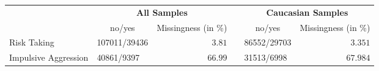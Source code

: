 \begin{tabular}{llrclr}
\hline\hline
\multicolumn{1}{l}{\bfseries }&\multicolumn{2}{c}{\bfseries All Samples}&\multicolumn{1}{c}{\bfseries }&\multicolumn{2}{c}{\bfseries Caucasian Samples}\tabularnewline
\cline{2-3} \cline{5-6}
\multicolumn{1}{l}{}&\multicolumn{1}{c}{no/yes}&\multicolumn{1}{c}{Missingness (in \%)}&\multicolumn{1}{c}{}&\multicolumn{1}{c}{no/yes}&\multicolumn{1}{c}{Missingness (in \%)}\tabularnewline
\hline
Risk Taking&107011/39436&$ 3.81$&&86552/29703&$ 3.351$\tabularnewline
Impulsive Aggression&40861/9397&$66.99$&&31513/6998&$67.984$\tabularnewline
\hline
\end{tabular}
